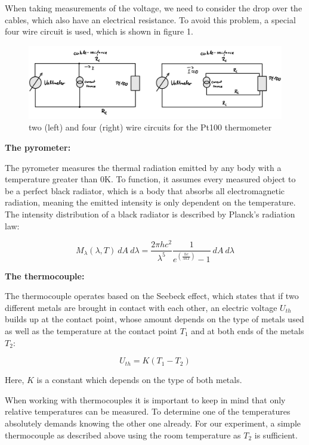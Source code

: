 \documentclass{article}
\begin{document}
\newpage

When taking measurements of the voltage, we need to consider the drop over the cables, which also have an electrical resistance. To avoid this problem, a special four wire circuit is used, which is shown in figure 1.

\begin{figure} [!ht]
    \centering
    \includegraphics[width=12cm]{graphics/sketch2.jpg}
    \caption{two (left) and four (right) wire circuits for the Pt100 thermometer}
\end{figure}

\textbf{The pyrometer:}

The pyrometer measures the thermal radiation emitted by any body with a temperature greater than 0K. To function, it assumes every measured object to be a perfect black radiator, which is a body that absorbs all electromagnetic radiation, meaning the emitted intensity is only dependent on the temperature. The intensity distribution of a black radiator is described by Planck's radiation law:

\begin{equation}
    M_{\lambda} (\lambda, T) \ dA \ d \lambda = \frac{2 \pi h c^2}{\lambda^5} \frac{1}{e^{\left( \frac{hc}{\lambda k T} \right)}-1} \ dA \ d \lambda 
\end{equation}

\textbf{The thermocouple:}

The thermocouple operates based on the Seebeck effect, which states that if two different metals are brought in contact with each other, an electric voltage $U_{th}$ builds up at the contact point, whose amount depends on the type of metals used as well as the temperature at the contact point $T_1$ and at both ends of the metals $T_2$:

\begin{equation}
    U_{th} = K(T_1 - T_2)
\end{equation}

Here, $K$ is a constant which depends on the type of both metals. 

When working with thermocouples it is important to keep in mind that only relative temperatures can be measured. To determine one of the temperatures absolutely demands knowing the other one already. For our experiment, a simple thermocouple as described above using the room temperature as $T_2$ is sufficient.
\end{document}
